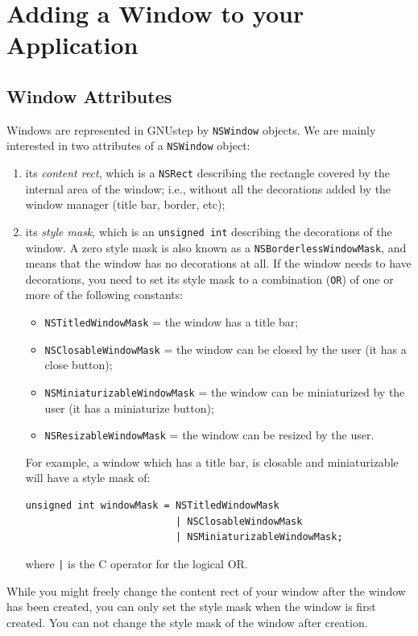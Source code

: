\documentclass[a4paper]{article}
\begin{document}
\section{Adding a Window to your Application}
\subsection{Window Attributes}
Windows are represented in GNUstep by \texttt{NSWindow} objects.  We
are mainly interested in two attributes of a \texttt{NSWindow} object:
\begin{enumerate}
\item its \emph{content rect}, which is a \texttt{NSRect} describing
  the rectangle covered by the internal area of the window; i.e.,
  without all the decorations added by the window manager (title bar,
  border, etc);
\item its \emph{style mask}, which is an \texttt{unsigned int}
  describing the decorations of the window.  A zero style mask is also
  known as a \texttt{NSBorderlessWindowMask}, and means that the
  window has no decorations at all.  If the window needs to have
  decorations, you need to set its style mask to a combination
  (\texttt{OR}) of one or more of the following constants:
\begin{itemize}
\item \texttt{NSTitledWindowMask} = the window has a title bar;
\item \texttt{NSClosableWindowMask} = the window can be closed by the
  user (it has a close button);
\item \texttt{NSMiniaturizableWindowMask} = the window can be
  miniaturized by the user (it has a miniaturize button);
\item \texttt{NSResizableWindowMask} = the window can be resized by
  the user.
\end{itemize}
For example, a window which has a title bar, is closable and
miniaturizable will have a style mask of:
\begin{verbatim}
unsigned int windowMask = NSTitledWindowMask 
                          | NSClosableWindowMask 
                          | NSMiniaturizableWindowMask;
\end{verbatim}
where \texttt{|} is the C operator for the logical OR.
\end{enumerate}

While you might freely change the content rect of your window after
the window has been created, you can only set the style mask when the
window is first created.  You can not change the style mask of the
window after creation.
\end{document}
